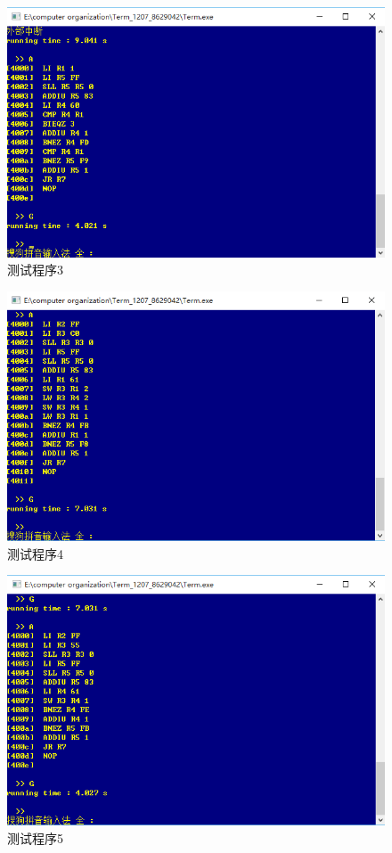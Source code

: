 \begin{figure}[H]
  \centering
  \includegraphics[width=5in]{Figures/cpu3.png}
  \caption{测试程序3}
\end{figure}

\begin{figure}[H]
  \centering
  \includegraphics[width=5in]{Figures/cpu4.png}
  \caption{测试程序4}
\end{figure}

\begin{figure}[H]
  \centering
  \includegraphics[width=5in]{Figures/cpu5.png}
  \caption{测试程序5}
\end{figure}

